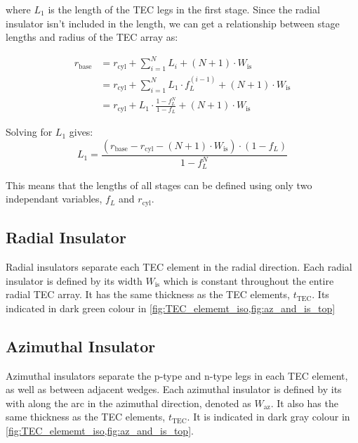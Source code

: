 \documentclass[10pt,a4paper,twocolumn]{article}
\begin{document}
where $L_1$ is the length of the TEC legs in the first stage. Since the radial insulator isn't included in the length, we can get a relationship between stage lengths and radius of the TEC array as:

\begin{equation*}
	\begin{aligned}
		r_{\text{base}} & = r_{\text{cyl}} + \sum_{i=1}^{N} L_i + (N+1) \cdot W_{\text{is}}                    \\
		                & =  r_{\text{cyl}} + \sum_{i=1}^{N} L_1 \cdot f_L^{(i-1)} + (N+1) \cdot W_{\text{is}} \\
		                & =  r_{\text{cyl}} + L_1 \cdot \frac{1-f_L^{N}}{1-f_L} + (N+1) \cdot W_{\text{is}}
	\end{aligned}
\end{equation*}

Solving for $L_1$ gives:
\begin{equation}
	L_1 = \frac{(r_{\text{base}} - r_{\text{cyl}} - (N+1) \cdot W_{\text{is}}) \cdot (1-f_L)}{1-f_L^{N}}
\end{equation}

This means that the lengths of all stages can be defined using only two independant variables, $f_L$ and $r_{\text{cyl}}$.

\subsection{Radial Insulator}

Radial insulators separate each TEC element in the radial direction. Each radial insulator is defined by its width $W_{\text{is}}$ which is constant throughout the entire radial TEC array. It has the same thickness as the TEC elements, $t_{\text{TEC}}$. Its indicated in dark green colour in \cref{fig:TEC_elememt_iso,fig:az_and_is_top}

\subsection{Azimuthal Insulator}

Azimuthal insulators separate the p-type and n-type legs in each TEC element, as well as between adjacent wedges. Each azimuthal insulator is defined by its with along the arc in the azimuthal direction, denoted as $W_{\text{az}}$. It also has the same thickness as the TEC elements, $t_{\text{TEC}}$. It is indicated in dark gray colour in \cref{fig:TEC_elememt_iso,fig:az_and_is_top}.
\end{document}
